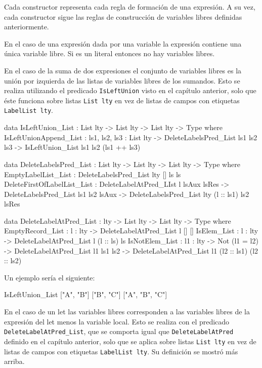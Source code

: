 Cada constructor representa cada regla de formación de una expresión. A su vez, cada constructor sigue las reglas de construcción de variables libres definidas anteriormente.

En el caso de una expresión dada por una variable la expresión contiene una única variable libre. Si es un literal entonces no hay variables libres.

En el caso de la suma de dos expresiones el conjunto de variables libres es la unión por izquierda de las listas de variables libres de los sumandos. Esto se realiza utilizando el predicado \texttt{IsLeftUnion} visto en el capítulo anterior, solo que éste funciona sobre listas  \texttt{List lty} en vez de listas de campos con etiquetas \texttt{LabelList lty}.

\begin{code}
data IsLeftUnion_List : List lty -> List lty ->
  List lty -> Type where
  IsLeftUnionAppend_List :
    {ls1, ls2, ls3 : List lty} ->
    DeleteLabelsPred_List ls1 ls2 ls3 ->
    IsLeftUnion_List ls1 ls2 (ls1 ++ ls3)

data DeleteLabelsPred_List : List lty -> List lty ->
  List lty -> Type where
  EmptyLabelList_List : DeleteLabelsPred_List {lty} [] ls ls
  DeleteFirstOfLabelList_List : 
    DeleteLabelAtPred_LIst l lsAux lsRes ->
    DeleteLabelsPred_List ls1 ls2 lsAux ->
    DeleteLabelsPred_List {lty} (l :: ls1) ls2 lsRes

data DeleteLabelAtPred_List : lty -> List lty ->
  List lty -> Type where
  EmptyRecord_List : {l : lty} -> DeleteLabelAtPred_List l [] []
  IsElem_List : {l : lty} -> DeleteLabelAtPred_List l (l :: ls) ls
  IsNotElem_List : {l1 : lty} -> Not (l1 = l2) ->
    DeleteLabelAtPred_List l1 ls1 ls2 ->
    DeleteLabelAtPred_List l1 (l2 :: ls1) (l2 :: ls2)
\end{code}

Un ejemplo sería el siguiente:

\begin{code}
IsLeftUnion_List ["A", "B"] ["B", "C"]
  ["A", "B", "C"]
\end{code}

En el caso de un let las variables libres corresponden a las variables libres de la expresión del let menos la variable local. Esto se realiza con el predicado \texttt{DeleteLabelAtPred\_List}, que se comporta igual que \texttt{DeleteLabelAtPred} definido en el capítulo anterior, solo que se aplica sobre listas \texttt{List lty} en vez de listas de campos con etiquetas \texttt{LabelList lty}. Su definición se mostró más arriba.


